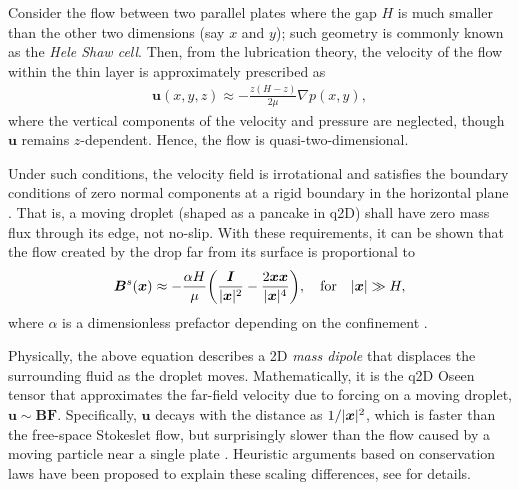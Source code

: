 \medskip
Consider the flow between two parallel plates where the gap $H$ is much smaller than the other two dimensions (say $x$ and $y$); such geometry is commonly known as the \emph{Hele Shaw cell}. Then, from the lubrication theory, the velocity of the flow within the thin layer is approximately prescribed as 
 \begin{equation} \label{eq:hele-shaw}
  \begin{aligned}
    {\bm u}(x,y,z) \approx -\frac{z(H-z)}{2\mu} \nabla p(x,y),
  \end{aligned}
 \end{equation}
where the vertical components of the velocity and pressure are neglected, though ${\bm u}$ remains $z$-dependent. Hence, the flow is quasi-two-dimensional.

Under such conditions, the velocity field is irrotational and satisfies the boundary conditions of zero normal components at a rigid boundary in the horizontal plane \citep{Batchelor}.
That is, a moving droplet (shaped as a pancake in q2D) shall have zero mass flux through its edge, not no-slip.
With these requirements, it can be shown that the flow created by the drop far from its surface is proportional to
\begin{equation} \label{eq:dipolar}
 \begin{aligned}
   {\bm B}^s({\bm x}) \approx -\frac{\alpha H}{\mu} \bigg( \frac{{\bm I}}{\lvert\bm x\rvert^2} -\frac{ 2{\bm x}{\bm x} }{ \lvert{\bm x}\rvert^4} \bigg),
   \quad \textrm{for} \quad \lvert\bm x\rvert \gg H,
 \end{aligned}
\end{equation}
where $\alpha$ is a dimensionless prefactor depending on the confinement \citep{Diamant}.

Physically, the above equation describes a 2D \emph{mass dipole} that displaces the surrounding fluid as the droplet moves.
Mathematically, it is the q2D Oseen tensor that approximates the far-field velocity due to forcing on a moving droplet, \ie ${\bm u} \sim {\bm B}{\bm F}$.
Specifically, ${\bm u}$ decays with the distance as $1/\lvert\bm x\rvert^2$, which is faster than the free-space Stokeslet flow, but surprisingly slower than the flow caused by a moving particle near a single plate \citep{Cui2004}.
Heuristic arguments based on conservation laws have been proposed to explain these scaling differences, see \cite{Diamant} for details.

